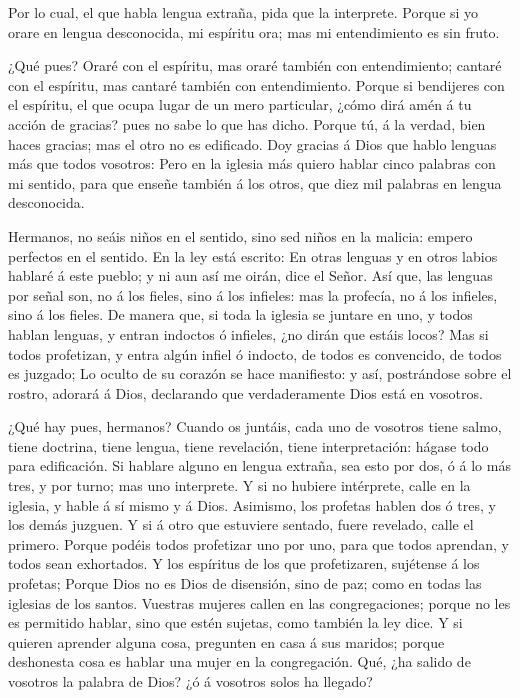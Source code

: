  Por lo cual, el que habla lengua extraña, pida que la
interprete.  Porque si yo orare en lengua desconocida, mi
espíritu ora; mas mi entendimiento es sin fruto.

 ¿Qué pues? Oraré con el espíritu, mas oraré también con
entendimiento; cantaré con el espíritu, mas cantaré también con
entendimiento.  Porque si bendijeres con el espíritu, el
que ocupa lugar de un mero particular, ¿cómo dirá amén á tu acción de
gracias? pues no sabe lo que has dicho.  Porque tú, á la
verdad, bien haces gracias; mas el otro no es edificado. 
Doy gracias á Dios que hablo lenguas más que todos vosotros:
 Pero en la iglesia más quiero hablar cinco palabras con mi
sentido, para que enseñe también á los otros, que diez mil palabras en
lengua desconocida.

 Hermanos, no seáis niños en el sentido, sino sed niños en
la malicia: empero perfectos en el sentido.  En la ley está
escrito: En otras lenguas y en otros labios hablaré á este pueblo; y ni
aun así me oirán, dice el Señor.  Así que, las lenguas por
señal son, no á los fieles, sino á los infieles: mas la profecía, no á
los infieles, sino á los fieles.  De manera que, si toda la
iglesia se juntare en uno, y todos hablan lenguas, y entran indoctos ó
infieles, ¿no dirán que estáis locos?  Mas si todos
profetizan, y entra algún infiel ó indocto, de todos es convencido, de
todos es juzgado;  Lo oculto de su corazón se hace
manifiesto: y así, postrándose sobre el rostro, adorará á Dios,
declarando que verdaderamente Dios está en vosotros.

 ¿Qué hay pues, hermanos? Cuando os juntáis, cada uno de
vosotros tiene salmo, tiene doctrina, tiene lengua, tiene revelación,
tiene interpretación: hágase todo para edificación.  Si
hablare alguno en lengua extraña, sea esto por dos, ó á lo más tres, y
por turno; mas uno interprete.  Y si no hubiere intérprete,
calle en la iglesia, y hable á sí mismo y á Dios. 
Asimismo, los profetas hablen dos ó tres, y los demás juzguen.
 Y si á otro que estuviere sentado, fuere revelado, calle
el primero.  Porque podéis todos profetizar uno por uno,
para que todos aprendan, y todos sean exhortados.  Y los
espíritus de los que profetizaren, sujétense á los profetas;
 Porque Dios no es Dios de disensión, sino de paz; como en
todas las iglesias de los santos.  Vuestras mujeres callen
en las congregaciones; porque no les es permitido hablar, sino que estén
sujetas, como también la ley dice.  Y si quieren aprender
alguna cosa, pregunten en casa á sus maridos; porque deshonesta cosa es
hablar una mujer en la congregación.  Qué, ¿ha salido de
vosotros la palabra de Dios? ¿ó á vosotros solos ha llegado?

